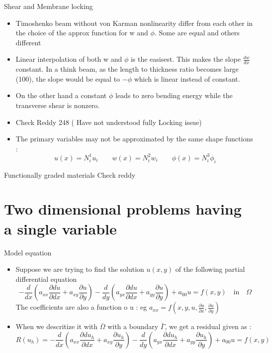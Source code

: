 	\begin{frame}{Shear and Membrane locking}
		\begin{itemize}
			\item Timoshenko beam without von Karman nonlinearity differ from each other in the choice of the approx function for w and $\phi$. Some are equal and others different
			\item Linear interpolation of both w and $\phi$ is the easisest. This makes the slope $\frac{dw}{dx}$ constant. In a think beam, as the length to thickness ratio becomes large (100), the slope would be equal to $-\phi$ which is linear instead of constant. 
			\item On the other hand a constant $\phi$ leads to zero bending energy while the transverse shear is nonzero. 
			\item  Check Reddy 248 ( Have not understood fully Locking issue)
			\item The primary variables may not be approximated by the same shape functions :
			\begin{equation}
			u(x) = N^1_iu_i \qquad w(x) = N^2_iw_i \qquad \phi(x) = N^3_i\phi_i
			\end{equation}
		\end{itemize}
	\end{frame}


	\begin{frame}{Functionally graded materials}
		Check reddy
	\end{frame}
	
	
	
	\section{Two dimensional problems having a single variable}
	\begin{frame}{Model equation}
		\begin{itemize}
			\item Suppose we are trying to find the solution $u(x,y)$ of the following partial differential equation
			\begin{equation}
			 -\frac{d}{dx}\left(a_{xx} \frac{\partial du}{\partial dx} + a_{xy} \frac{\partial u}{\partial y} \right)
			 -\frac{d}{dy}\left(a_{yx} \frac{\partial du}{\partial dx} + a_{yy} \frac{\partial u}{\partial y} \right) + a_{00} u = f(x,y) \quad \text{in} \quad \Omega
			\end{equation}	
			The coefficients are also a function o u : eg $a_{xx} = f(x,y,u,\frac{\partial u}{\partial x }, \frac{\partial u}{\partial y})$
			\item When we descritize it with $\bar{\Omega}$ with a boundary $\bar{\Gamma}$, we get a residual given as :
			\begin{equation}
				R(u_h) = 
				-\frac{d}{dx}\left(a_{xx} \frac{\partial du_h}{\partial dx} + a_{xy} \frac{\partial u_h}{\partial y} \right)
				-\frac{d}{dy}\left(a_{yx} \frac{\partial du_h}{\partial dx} + a_{yy} \frac{\partial u_h}{\partial y} \right) + a_{00} u = f(x,y)
			\end{equation}
		\end{itemize}
	\end{frame}


